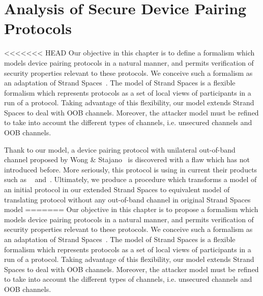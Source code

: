 
\chapter{Analysis of Secure Device Pairing Protocols} %

\label{Analysis of Secure Device Pairing Protocols} %


<<<<<<< HEAD
Our objective in this chapter is to define a formalism which models device pairing protocols 
in a natural manner, and permits verification of security properties relevant to these protocols.
We conceive such a formalism as an adaptation of Strand Spaces~\cite{674832}. The model of Strand Spaces is a flexible formalism which represents protocols as a set of local views of participants in a run of a protocol. Taking advantage of this flexibility, our model extends Strand Spaces to deal with OOB channels. Moreover, the attacker model must be refined to take into account the different types of channels, i.e. unsecured channels and OOB channels.

Thank to our model, a device pairing protocol with unilateral out-of-band channel proposed by Wong \& Stajano~\cite{10.1109/MPRV.2007.76} is discovered with a flaw which has not introduced before. More seriously, this protocol is using in current their products such as ~\cite{Stajano:2011aa} and~\cite{Stajano:2014aa}. Ultimately, we produce a procedure which transforms a model of an initial protocol in our extended Strand Spaces to equivalent model of translating protocol without any out-of-band channel in original Strand Spaces model
=======
Our objective in this chapter is to propose a formalism which models device pairing protocols 
in a natural manner, and permits verification of security properties relevant to these protocols.
We conceive such a formalism as an adaptation of Strand Spaces~\cite{674832}. The model of Strand Spaces is a flexible formalism which represents protocols as a set of local views of participants in a run of a protocol. Taking advantage of this flexibility, our model extends Strand Spaces to deal with OOB channels. Moreover, the attacker model must be refined to take into account the different types of channels, i.e. unsecured channels and OOB channels.

